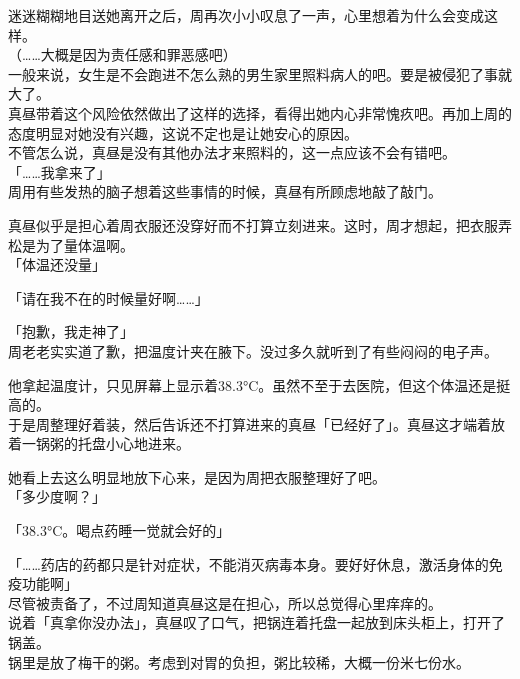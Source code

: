 迷迷糊糊地目送她离开之后，周再次小小叹息了一声，心里想着为什么会变成这样。\\

（……大概是因为责任感和罪恶感吧）\\

一般来说，女生是不会跑进不怎么熟的男生家里照料病人的吧。要是被侵犯了事就大了。\\

真昼带着这个风险依然做出了这样的选择，看得出她内心非常愧疚吧。再加上周的态度明显对她没有兴趣，这说不定也是让她安心的原因。\\

不管怎么说，真昼是没有其他办法才来照料的，这一点应该不会有错吧。\\

「……我拿来了」\\

周用有些发热的脑子想着这些事情的时候，真昼有所顾虑地敲了敲门。

真昼似乎是担心着周衣服还没穿好而不打算立刻进来。这时，周才想起，把衣服弄松是为了量体温啊。\\

「体温还没量」

「请在我不在的时候量好啊……」

「抱歉，我走神了」\\

周老老实实道了歉，把温度计夹在腋下。没过多久就听到了有些闷闷的电子声。

他拿起温度计，只见屏幕上显示着38.3°C。虽然不至于去医院，但这个体温还是挺高的。\\

于是周整理好着装，然后告诉还不打算进来的真昼「已经好了」。真昼这才端着放着一锅粥的托盘小心地进来。

她看上去这么明显地放下心来，是因为周把衣服整理好了吧。\\

「多少度啊？」

「38.3°C。喝点药睡一觉就会好的」

「……药店的药都只是针对症状，不能消灭病毒本身。要好好休息，激活身体的免疫功能啊」\\

尽管被责备了，不过周知道真昼这是在担心，所以总觉得心里痒痒的。\\

说着「真拿你没办法」，真昼叹了口气，把锅连着托盘一起放到床头柜上，打开了锅盖。\\

锅里是放了梅干的粥。考虑到对胃的负担，粥比较稀，大概一份米七份水。

